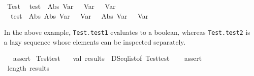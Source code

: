 \begin{isabellebody}
\isanewline
{}\isamarkupfalse%
\ Test\isanewline
{}\isanewline
\ \ test{}\ {}\ {}Abs\ {}Var\ {}{}\ {}\ Var\ {}\ {}\ Var\ {}{}\isanewline
\ \ test{}\ {}\ {}Abs\ {}Abs\ {}Var\ {}\ {}\ Var\ {}{}\ {}\ {}Abs\ {}Var\ {}{}\ {}\ Var\ {}{}{}\ {}\ {}{}%
\begin{isamarkuptext}%
In the above example, \verb|Test.test1| evaluates to a boolean,
  whereas \verb|Test.test2| is a lazy sequence whose elements can be
  inspected separately.%
\end{isamarkuptext}%
\isamarkuptrue%
%
\isadelimML
%
\endisadelimML
%
\isatagML
{}\isamarkupfalse%
\ {}\ %
\isaantiq
assert{}%
\endisaantiq
\ Test{}test{}\ {}\isanewline
{}\isamarkupfalse%
\ {}\ val\ results\ {}\ DSeq{}list{}of\ Test{}test{}\ {}\isanewline
{}\isamarkupfalse%
\ {}\ %
\isaantiq
assert{}%
\endisaantiq
\ {}length\ results\ {}\ {}{}\ {}%

\end{isabellebody}
